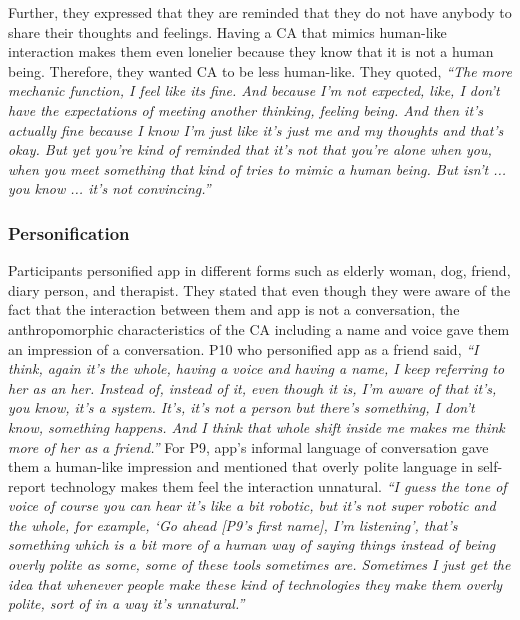         Further, they expressed that they are reminded that they do not have anybody to share their thoughts and feelings. Having a \ac{CA} that mimics human-like interaction makes them even lonelier because they know that it is not a human being. Therefore, they wanted \ac{CA} to be less human-like. They quoted,
                \textit{``The more mechanic function, I feel like its fine. And because I'm not expected, like, I don't have the expectations of meeting another thinking, feeling being. And then it's actually fine because I know I'm just like it's just me and my thoughts and that's okay. But yet you're kind of reminded that it's not that you're alone when you, when you meet something that kind of tries to mimic a human being. But isn't ... you know ... it's not convincing.''
                }

        \subsubsection{Personification}
        Participants personified \acl{app} in different forms such as elderly woman, dog, friend, diary person, and therapist.
        They stated that even though they were aware of the fact that the interaction between them and \acl{app} is not a conversation, the anthropomorphic characteristics of the \ac{CA} including a name and voice gave them an impression of a conversation.
        P10 who personified \acl{app} as a friend said,
                \textit{``I think, again it's the whole, having a voice and having a name, I keep referring to her as an her. Instead of, instead of it, even though it is, I'm aware of that it's, you know, it's a system. It's, it's not a person but there's something, I don't know, something happens. And I think that whole shift inside me makes me think more of her as a friend.''}
            For P9, \acl{app}'s informal language of conversation gave them a human-like impression and mentioned that overly polite language in self-report technology makes them feel the interaction unnatural.
                \textit{``I guess the tone of voice of course you can hear it's like a bit robotic, but it's not super robotic and the whole, for example, `Go ahead [P9's first name], I'm listening', that's something which is a bit more of a human way of saying things instead of being overly polite as some, some of these tools sometimes are. Sometimes I just get the idea that whenever people make these kind of technologies they make them overly polite, sort of in a way it's unnatural.''
                }
            
